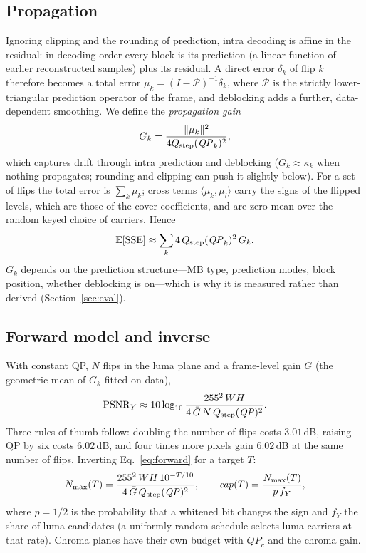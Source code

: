 \subsection{Propagation}
Ignoring clipping and the rounding of prediction, intra decoding is affine in the residual: in decoding order every block is its prediction (a linear function of earlier reconstructed samples) plus its residual. A direct error $\delta_k$ of flip $k$ therefore becomes a total error $\mu_k=(I-\mathcal P)^{-1}\delta_k$, where $\mathcal P$ is the strictly lower-triangular prediction operator of the frame, and deblocking adds a further, data-dependent smoothing. We define the \emph{propagation gain}
\begin{equation}
G_k=\frac{\|\mu_k\|^2}{4Q_{\mathrm{step}}(\mathit{QP}_k)^2},
\end{equation}
which captures drift through intra prediction and deblocking ($G_k\approx\kappa_k$ when nothing propagates; rounding and clipping can push it slightly below). For a set of flips the total error is $\sum_k\mu_k$; cross terms $\langle\mu_k,\mu_l\rangle$ carry the signs of the flipped levels, which are those of the cover coefficients, and are zero-mean over the random keyed choice of carriers. Hence
\begin{equation}
\mathbb E[\mathrm{SSE}]\approx\sum_k 4\,Q_{\mathrm{step}}(\mathit{QP}_k)^2\,G_k .
\end{equation}
$G_k$ depends on the prediction structure---MB type, prediction modes, block position, whether deblocking is on---which is why it is measured rather than derived (Section~\ref{sec:eval}).

\subsection{Forward model and inverse}
With constant QP, $N$ flips in the luma plane and a frame-level gain $\bar G$ (the geometric mean of $G_k$ fitted on data),
\begin{equation}
\mathrm{PSNR}_Y\approx10\log_{10}\frac{255^2\,W H}{4\,\bar G\,N\,Q_{\mathrm{step}}(\mathit{QP})^2}.
\label{eq:forward}
\end{equation}
Three rules of thumb follow: doubling the number of flips costs $3.01$\,dB, raising QP by six costs $6.02$\,dB, and four times more pixels gain $6.02$\,dB at the same number of flips. Inverting Eq.~\eqref{eq:forward} for a target $T$:
\begin{equation}
N_{\max}(T)=\frac{255^2\,W H\,10^{-T/10}}{4\,\bar G\,Q_{\mathrm{step}}(\mathit{QP})^2},\qquad
\mathit{cap}(T)=\frac{N_{\max}(T)}{p\,f_Y},
\label{eq:inverse-cap}
\end{equation}
where $p=1/2$ is the probability that a whitened bit changes the sign and $f_Y$ the share of luma candidates (a uniformly random schedule selects luma carriers at that rate). Chroma planes have their own budget with $\mathit{QP}_c$ and the chroma gain.

